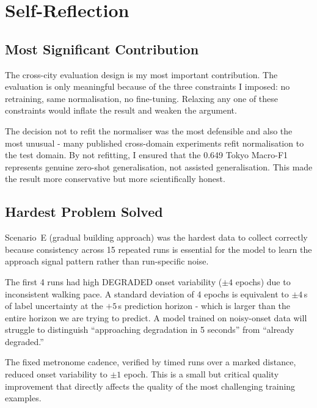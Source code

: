 \documentclass[12pt,a4paper]{article}
\begin{document}
\newpage
\section{Self-Reflection}

\subsection{Most Significant Contribution}

The cross-city evaluation design is my most important contribution.
The evaluation is only meaningful because of the three constraints I imposed:
no retraining, same normalisation, no fine-tuning.
Relaxing any one of these constraints would inflate the result and weaken the argument.

The decision not to refit the normaliser was the most defensible and also the most
unusual - many published cross-domain experiments refit normalisation to the test domain.
By not refitting, I ensured that the 0.649 Tokyo Macro-F1 represents genuine zero-shot
generalisation, not assisted generalisation.
This made the result more conservative but more scientifically honest.

\subsection{Hardest Problem Solved}

Scenario~E (gradual building approach) was the hardest data to collect correctly because
consistency across 15 repeated runs is essential for the model to learn the approach
signal pattern rather than run-specific noise.

The first 4 runs had high DEGRADED onset variability ($\pm 4$ epochs) due to inconsistent
walking pace.
A standard deviation of 4 epochs is equivalent to $\pm 4$\,s of label uncertainty
at the $+5$\,s prediction horizon - which is larger than the entire horizon we are
trying to predict.
A model trained on noisy-onset data will struggle to distinguish ``approaching degradation
in 5 seconds'' from ``already degraded.''

The fixed metronome cadence, verified by timed runs over a marked distance,
reduced onset variability to $\pm 1$ epoch.
This is a small but critical quality improvement that directly affects the quality of the
most challenging training examples.




\end{document}
